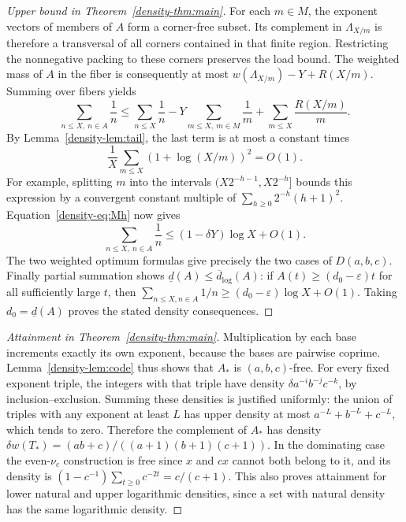 \documentclass[11pt,a4paper]{article}
\theoremstyle{remark}\newtheorem{remark}[theorem]{Remark}
\numberwithin{equation}{section}
\begin{document}
\begin{proof}[Upper bound in Theorem~\ref{density-thm:main}]
For each $m\in M$, the exponent vectors of members of $A$ form a
corner-free subset. Its complement in $\Lambda_{X/m}$ is therefore
a transversal of all corners contained in that finite region.
Restricting the nonnegative packing to these corners preserves the
load bound. The weighted mass of $A$ in the fiber is consequently
at most $w(\Lambda_{X/m})-Y+R(X/m)$.
Summing over fibers yields
\[
\sum_{n\le X,\ n\in A}\frac1n
\le \sum_{n\le X}\frac1n
-Y\sum_{m\le X,\ m\in M}\frac1m
+\sum_{m\le X}\frac{R(X/m)}m.
\]
By Lemma~\ref{density-lem:tail}, the last term is at most a constant times
\[
\frac1X\sum_{m\le X}(1+\log(X/m))^2=O(1).
\]
For example, splitting $m$ into the intervals
$(X2^{-h-1},X2^{-h}]$ bounds this expression by a convergent
constant multiple of $\sum_{h\ge0}2^{-h}(h+1)^2$.
Equation~\eqref{density-eq:Mh} now gives
\[
\sum_{n\le X,\ n\in A}\frac1n
\le(1-\delta Y)\log X+O(1).
\]
The two weighted optimum formulas give precisely the two cases of
$D(a,b,c)$.
Finally partial summation shows
$\underline d(A)\le\overline d_{\log}(A)$: if
$A(t)\ge(d_0-\varepsilon)t$ for all sufficiently large $t$, then
$\sum_{n\le X,n\in A}1/n\ge(d_0-\varepsilon)\log X+O(1)$.
Taking $d_0=\underline d(A)$ proves the stated density consequences.
\end{proof}

\begin{proof}[Attainment in Theorem~\ref{density-thm:main}]
Multiplication by each base increments exactly its own exponent,
because the bases are pairwise coprime. Lemma~\ref{density-lem:code} thus
shows that $A_*$ is $(a,b,c)$-free.
For every fixed exponent triple, the integers with that triple
have density $\delta a^{-i}b^{-j}c^{-k}$, by inclusion--exclusion.
Summing these densities is justified uniformly: the union of triples
with any exponent at least $L$ has upper density at most
$a^{-L}+b^{-L}+c^{-L}$, which tends to zero.
Therefore the complement of $A_*$ has density
$\delta w(T_*)=(ab+c)/((a+1)(b+1)(c+1))$.
In the dominating case the even-$\nu_c$ construction is free since
$x$ and $cx$ cannot both belong to it, and its density is
$(1-c^{-1})\sum_{t\ge0}c^{-2t}=c/(c+1)$.
This also proves attainment for lower natural and upper logarithmic
densities, since a set with natural density has the same logarithmic
density.
\end{proof}
\end{document}

